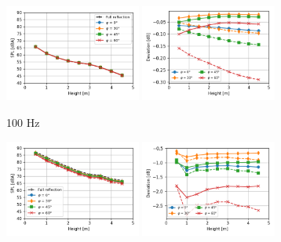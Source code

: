 \begin{figure}[H]
	\centering
	\begin{subfigure}[b]{\textwidth}
		\centering
		\includegraphics[width=0.49\textwidth]{fig/chap5/impedance/third_octave/SPL_100_Hz.png}
		\includegraphics[width=0.49\textwidth]{fig/chap5/impedance/third_octave/deviation_100_Hz.png}
		\caption{100 Hz}
	\end{subfigure}
	\begin{subfigure}[b]{\textwidth}
		\centering
		\includegraphics[width=0.49\textwidth]{fig/chap5/impedance/third_octave/SPL_1000_Hz.png}
		\includegraphics[width=0.49\textwidth]{fig/chap5/impedance/third_octave/deviation_1000_Hz.png}

\end{subfigure}
\end{figure}
